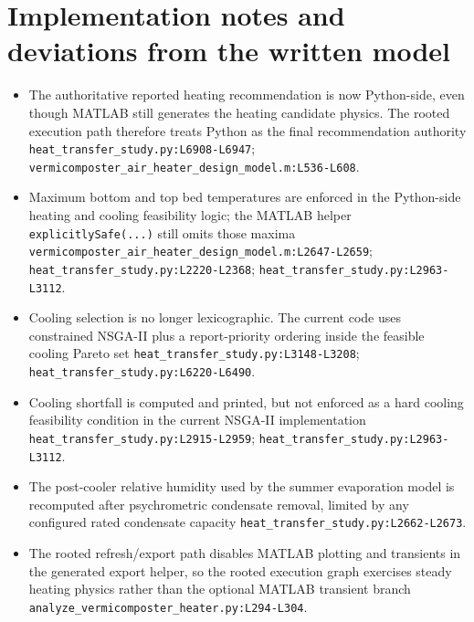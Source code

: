 \documentclass[11pt]{article}
\newcommand{\srcref}[1]{\nolinkurl{#1}}
\newcommand{\code}[1]{\nolinkurl{#1}}
\begin{document}
\section{Implementation notes and deviations from the written model}
\begin{itemize}[leftmargin=*]
\item The authoritative reported heating recommendation is now Python-side, even though MATLAB still generates the heating candidate physics. The rooted execution path therefore treats Python as the final recommendation authority \srcref{heat_transfer_study.py:L6908-L6947}; \srcref{vermicomposter_air_heater_design_model.m:L536-L608}.
\item Maximum bottom and top bed temperatures are enforced in the Python-side heating and cooling feasibility logic; the MATLAB helper \code{explicitlySafe(...)} still omits those maxima \srcref{vermicomposter_air_heater_design_model.m:L2647-L2659}; \srcref{heat_transfer_study.py:L2220-L2368}; \srcref{heat_transfer_study.py:L2963-L3112}.
\item Cooling selection is no longer lexicographic. The current code uses constrained NSGA-II plus a report-priority ordering inside the feasible cooling Pareto set \srcref{heat_transfer_study.py:L3148-L3208}; \srcref{heat_transfer_study.py:L6220-L6490}.
\item Cooling shortfall is computed and printed, but not enforced as a hard cooling feasibility condition in the current NSGA-II implementation \srcref{heat_transfer_study.py:L2915-L2959}; \srcref{heat_transfer_study.py:L2963-L3112}.
\item The post-cooler relative humidity used by the summer evaporation model is recomputed after psychrometric condensate removal, limited by any configured rated condensate capacity \srcref{heat_transfer_study.py:L2662-L2673}.
\item The rooted refresh/export path disables MATLAB plotting and transients in the generated export helper, so the rooted execution graph exercises steady heating physics rather than the optional MATLAB transient branch \srcref{analyze_vermicomposter_heater.py:L294-L304}.
\end{itemize}
\end{document}

